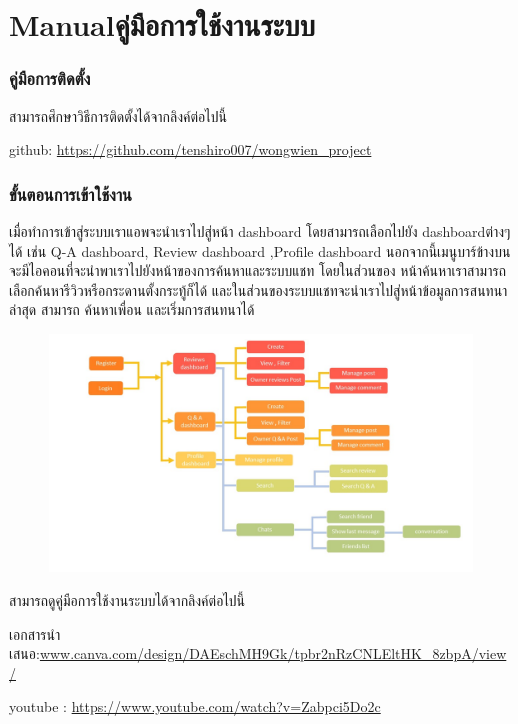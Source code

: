 
\ifenglish\else

\fi

\chapter{\ifenglish Manual\else คู่มือการใช้งานระบบ\fi}

\subsection{คู่มือการติดตั้ง }

สามารถศึกษาวิธีการติดตั้งได้จากลิงค์ต่อไปนี้

github: \href{https://github.com/tenshiro007/wongwien_project}{https://github.com/tenshiro007/wongwien\_project}

\subsection{ขั้นตอนการเข้าใช้งาน }

เมื่อทำการเข้าสู่ระบบเราแอพจะนำเราไปสู่หน้า dashboard โดยสามารถเลือกไปยัง dashboardต่างๆได้ เช่น Q-A dashboard, Review
dashboard ,Profile dashboard นอกจากนี้เมนูบาร์ข้างบนจะมีไอคอนที่จะนำพาเราไปยังหน้าของการค้นหาและระบบแชท โดยในส่วนของ
หน้าค้นหาเราสามารถเลือกค้นหารีวิวหรือกระดานตั้งกระทู้ก็ได้ และในส่วนของระบบแชทจะนำเราไปสู่หน้าข้อมูลการสนทนาล่าสุด สามารถ
ค้นหาเพื่อน และเริ่มการสนทนาได้
 \begin{figure}[h]
\begin{center}
  \includegraphics[width=1\textwidth]{./image/reviews/howtouse.JPG}
\end{center}  
\end{figure}

สามารถดูคู่มือการใช้งานระบบได้จากลิงค์ต่อไปนี้

เอกสารนำเสนอ:\href{www.canva.com/design/DAEschMH9Gk/tpbr2nRzCNLEltHK_8zbpA/view/}{www.canva.com/design/DAEschMH9Gk/tpbr2nRzCNLEltHK\_8zbpA/view/}

youtube : \href{https://www.youtube.com/watch?v=Zabpci5Do2c}{https://www.youtube.com/watch?v=Zabpci5Do2c}
